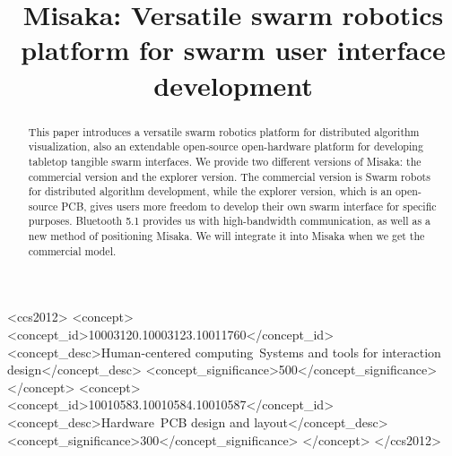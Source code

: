 \documentclass[sigconf]{acmart}
\begin{document}
\title{Misaka: Versatile swarm robotics platform for swarm user interface development}




\renewcommand{\shortauthors}{Tingliang and Haipeng}

\begin{abstract}
  This paper introduces a versatile swarm robotics platform for distributed algorithm visualization, also an extendable open-source open-hardware platform for developing tabletop tangible swarm interfaces. 
  We provide two different versions of Misaka: the commercial version and the explorer version. The commercial version is Swarm robots for distributed algorithm development, while the explorer version, which is an open-source PCB, gives users more freedom to develop their own swarm interface for specific purposes.
  Bluetooth 5.1 provides us with high-bandwidth communication, as well as a new method of positioning Misaka. We will integrate it into Misaka when we get the commercial model.


\end{abstract}

\begin{CCSXML}
  <ccs2012>
     <concept>
         <concept_id>10003120.10003123.10011760</concept_id>
         <concept_desc>Human-centered computing~Systems and tools for interaction design</concept_desc>
         <concept_significance>500</concept_significance>
         </concept>
     <concept>
         <concept_id>10010583.10010584.10010587</concept_id>
         <concept_desc>Hardware~PCB design and layout</concept_desc>
         <concept_significance>300</concept_significance>
         </concept>
   </ccs2012>
\end{CCSXML}
\end{document}
